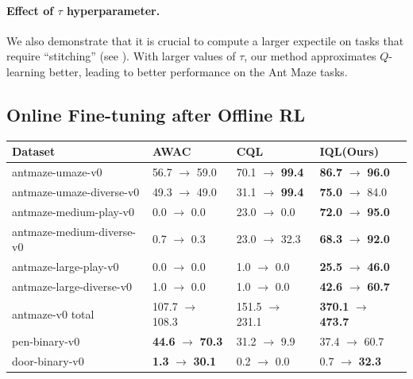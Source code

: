 \documentclass{article} %
\def\ourname{IQL\xspace}
\begin{document}
\paragraph{Effect of $\tau$ hyperparameter.} We also demonstrate that it is crucial to compute a larger expectile on tasks that require ``stitching'' (see ).
With larger values of $\tau$, our method approximates $Q$-learning better, leading to better performance on the Ant Maze tasks.


\subsection{Online Fine-tuning after Offline RL}
\label{sec:finetune}

\begin{table}
\scriptsize
\begin{tabular}{ l ||p{1.5cm} |p{1.5cm} | p{1.5cm}  }
    \centering
    Dataset & AWAC & CQL & \ourname (Ours) \\
    \hline
    antmaze-umaze-v0 & 56.7 \; $\rightarrow$ 59.0 & 70.1 \; $\rightarrow$ \textbf{99.4} & \textbf{86.7} \; $\rightarrow$ \textbf{96.0} \\
    antmaze-umaze-diverse-v0 & 49.3 \; $\rightarrow$ 49.0 & 31.1 \; $\rightarrow$ \textbf{99.4} & \textbf{75.0} \; $\rightarrow$ 84.0 \\
    antmaze-medium-play-v0 & 0.0 \; \; $\rightarrow$ 0.0 & 23.0 \; $\rightarrow$ 0.0 & \textbf{72.0} \; $\rightarrow$ \textbf{95.0} \\
    antmaze-medium-diverse-v0 & 0.7 \; \; $\rightarrow$ 0.3 & 23.0 \; $\rightarrow$ 32.3 & \textbf{68.3} \; $\rightarrow$ \textbf{92.0} \\
    antmaze-large-play-v0 & 0.0 \; \; $\rightarrow$ 0.0 & 1.0 \; \; $\rightarrow$ 0.0 & \textbf{25.5} \; $\rightarrow$ \textbf{46.0} \\
    antmaze-large-diverse-v0 & 1.0 \; \; $\rightarrow$ 0.0 & 1.0 \; \; $\rightarrow$ 0.0 & \textbf{42.6} \; $\rightarrow$ \textbf{60.7} \\ \hline
    antmaze-v0 total & 107.7 $\rightarrow$ 108.3 & 151.5 $\rightarrow$ 231.1 & \textbf{370.1} $\rightarrow$ \textbf{473.7} \\ \hline
    pen-binary-v0 & \textbf{44.6} \; $\rightarrow$ \textbf{70.3} & 31.2 \; $\rightarrow$ 9.9 & 37.4 \; $\rightarrow$ 60.7 \\
    door-binary-v0 & \textbf{1.3} \; \; $\rightarrow$ \textbf{30.1} & 0.2 \; \; $\rightarrow$ 0.0 & 0.7 \; \; $\rightarrow$ \textbf{32.3} \\

\end{tabular}
\end{table}
\end{document}
